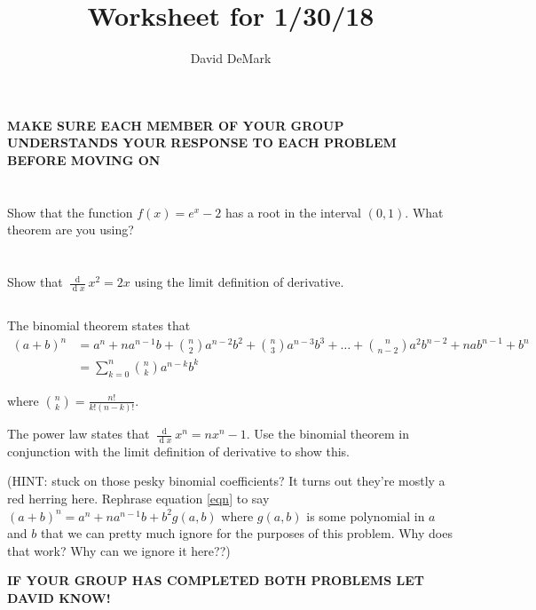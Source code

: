 \documentclass[english, 12pt]{article}
\title{Worksheet for 1/30/18}
\author{David DeMark}
\date{\due}
\renewcommand{\d}[1]{\ensuremath{\operatorname{d}\!{#1}}}
\newcommand{\ddx}[1]{\frac{\d{}}{\d{#1}}}
\newcommand{\prob}[1]{\setcounter{section}{#1-1}\section{}}
\newcommand{\prt}[1]{\setcounter{subsection}{#1-1}\subsection{}}
\theoremstyle{remark}
\theoremstyle{definition}
\begin{document}
	\textbf{{\large MAKE SURE EACH MEMBER OF YOUR GROUP UNDERSTANDS YOUR RESPONSE TO EACH PROBLEM BEFORE MOVING ON}}
\prob{1}{\large
Show that the function $f(x)=e^x-2$ has a root in the interval $(0,1)$. What theorem are you using?}\vspace{2em}
\prob{2}
\prt{1}{\large Show that $\ddx{x}x^2=2x$ using the limit definition of derivative.}\vspace{2em}
\prt{2}
{\large The binomial theorem states that} \begin{align}
(a+b)^n&=a^n+na^{n-1}b+{n\choose 2}a^{n-2}b^2+{n\choose 3}a^{n-3}b^3 +\ldots +{n\choose n-2}a^2b^{n-2}+nab^{n-1}+b^n\label{eqn}\\&= \sum_{k=0}^n{n\choose k}a^{n-k}b^k
\end{align} {\large where ${n\choose k}=\frac{n!}{k!(n-k)!}$.

The power law states that $\ddx{x}x^n=nx^n-1$. Use the binomial theorem in conjunction with the limit definition of derivative to show this.
\vspace{2em}

(HINT: stuck on those pesky binomial coefficients? It turns out they're mostly a red herring here. Rephrase equation \eqref{eqn} to say $(a+b)^n=a^n+na^{n-1}b+b^2g(a,b)$ where $g(a,b)$ is some polynomial in $a$ and $b$ that we can pretty much ignore for the purposes of this problem. Why does that work? Why can we ignore it here??)}
\vspace{2em}
\textbf{\large IF YOUR GROUP HAS COMPLETED BOTH PROBLEMS LET DAVID KNOW!}
\end{document}
